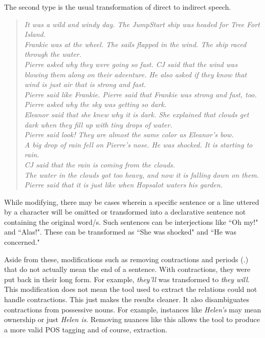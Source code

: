 The second type is the usual transformation of direct to indirect speech. 

\begin{verse}
\itshape
It was a wild and windy day. The JumpStart ship was headed for Tree Fort Island. \\
Frankie was at the wheel. The sails flapped in the wind. The ship raced through the water. \\
Pierre asked why they were going so fast. CJ said that the wind was blowing them along on their adventure. He also asked if they know that wind is just air that is strong and fast. \\
Pierre said like Frankie. Pierre said that Frankie was strong and fast, too. \\
Pierre asked why the sky was getting so dark.\\
Eleanor said that she knew why it is dark. She explained that clouds get dark when they fill up with tiny drops of water.\\
Pierre said look! They are almost the same color as Eleanor's bow. \\
A big drop of rain fell on Pierre's nose. He was shocked. It is starting to rain. \\
CJ said that the rain is coming from the clouds. \\
The water in the clouds got too heavy, and now it is falling down on them. \\
Pierre said that it is just like when Hopsalot waters his garden. \\
\end{verse}
	
While modifying, there may be cases wherein a specific sentence or a line uttered by a character will be omitted or transformed into a declarative sentence not containing the original word/s. Such sentences can be interjections like ``Oh my!" and ``Alas!". These can be transformed as ``She was shocked" and ``He was concerned."

Aside from these, modifications such as removing contractions and periods (.) that do not actually mean the end of a sentence. With contractions, they were put back in their long form. For example, \textit{they'll} was transformed to \textit{they will}. This modification does not mean the tool used to extract the relations could not handle contractions. This just makes the results cleaner. It also disambiguates contractions from possessive nouns. For example, instances like \textit{Helen's} may mean ownership or just \textit{Helen is}. Removing nuances like this allows the tool to produce a more valid POS tagging and of course, extraction. 

